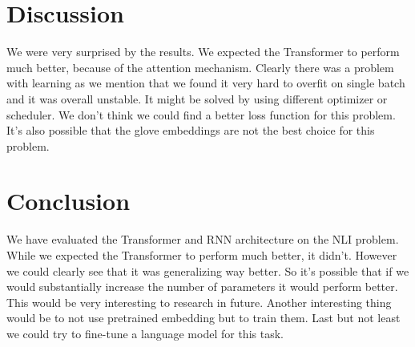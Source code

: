 \documentclass{article}
\begin{document}
    \section{Discussion}
    We were very surprised by the results. We expected the Transformer to perform much better, because
    of the attention mechanism. Clearly there was a problem with learning as we mention that we found it very hard
    to overfit on single batch and it was overall unstable. It might be solved by using different optimizer or scheduler. We don't think we could find
    a better loss function for this problem. It's also possible that the glove embeddings are not the best choice for this problem.

    \section{Conclusion}
    We have evaluated the Transformer and RNN architecture on the NLI problem.
    While we expected the Transformer to perform much better, it didn't. However we could clearly see that it was generalizing way better.
    So it's possible that if we would substantially increase the number of parameters it would perform better. This would be very interesting to research in future.
    Another interesting thing would be to not use pretrained embedding but to train them. Last but not least we could try to fine-tune a language model for this task.


    \printbibliography{}
\end{document}
